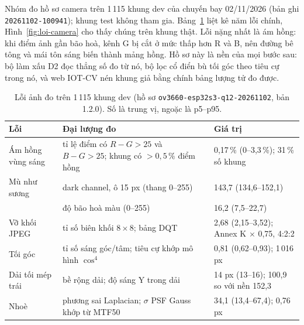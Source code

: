 Nhóm đo hồ sơ camera trên 1\,115 khung dev của chuyến bay 02/11/2026 (bản ghi \texttt{20261102-100941}); khung test không tham gia. Bảng~\ref{tab:camera} liệt kê năm lỗi chính, Hình~\ref{fig:loi-camera} cho thấy chúng trên khung thật. Lỗi nặng nhất là ám hồng: khi điểm ảnh gần bão hoà, kênh G bị cắt ở mức thấp hơn R và B, nên đường bê tông và mái tôn sáng biến thành mảng hồng. Hồ sơ này là nền của mọi bước sau: bộ làm xấu D2 đọc thẳng số đo từ nó, bộ lọc cổ điển bù tối góc theo tiêu cự trong nó, và web IOT-CV nén khung giả bằng chính bảng lượng tử đo được.

\begin{table}[!htbp]
\centering\footnotesize
\caption[Lỗi ảnh đo trên 1\,115 khung dev]{Lỗi ảnh đo trên 1\,115 khung dev (hồ sơ \texttt{ov3660-esp32s3-q12-20261102}, bản 1.2.0). Số là trung vị, ngoặc là p5–p95.}
\label{tab:camera}
\begin{tabularx}{\textwidth}{@{}l X l@{}}
\toprule
Lỗi & Đại lượng đo & Giá trị \\
\midrule
Ám hồng vùng sáng & tỉ lệ điểm có $R-G>25$ và $B-G>25$; khung có $>0{,}5\,\%$ điểm hồng & 0,17\,\% (0–3,3\,\%); 31\,\% số khung \\
Mù như sương & dark channel, ô 15 px (thang 0–255) & 143,7 (134,6–152,1) \\
 & độ bão hoà màu (0–255) & 16,2 (7,5–22,7) \\
Vỡ khối JPEG & tỉ số biên khối $8\times8$; bảng DQT & 2,68 (2,15–3,52); Annex K $\times$ 0,75, 4:2:2 \\
Tối góc & tỉ số sáng góc/tâm; tiêu cự khớp mô hình $\cos^4$ & 0,81 (0,62–0,93); 1\,016 px \\
Dải tối mép trái & bề rộng dải; độ sáng Y trong dải & 14 px (13–16); 100,9 so với nền 152,3 \\
Nhoè & phương sai Laplacian; $\sigma$ PSF Gauss khớp từ MTF50 & 34,1 (13,4–67,4); 0,76 px \\
\bottomrule
\end{tabularx}
\end{table}

